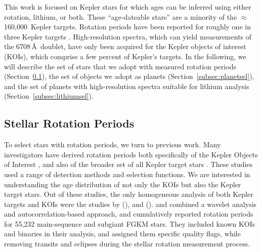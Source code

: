 \documentclass[11pt,twocolumn,tighten]{aastex63}
\newcommand{\nkeplerstars}{$\approx$160{,}000}
\begin{document}
This work is focused on Kepler stars for which ages can be inferred
using either rotation, lithium, or both.  These ``age-dateable
stars'' are a minority of the \nkeplerstars\ Kepler targets.  Rotation
periods have been reported for roughly one in three Kepler targets
\citep[e.g.][]{McQuillan_2014,Santos_2021}.  High-resolution spectra,
which can yield measurements of the  6708\,\AA\ doublet, 
have only been acquired for the Kepler objects of interest
(KOIs), which comprise a few percent of Kepler's targets.
In the following, we will describe the set of stars that we
adopt with measured rotation periods (Section~\ref{subsec:rotsel}),
the set of objects we adopt as planets
(Section~\ref{subsec:planetsel}), and the set of planets with
high-resolution spectra suitable for lithium analysis
(Section~\ref{subsec:lithiumsel}).


\subsection{Stellar Rotation Periods}
\label{subsec:rotsel}

To select stars with rotation periods, we turn to previous work.
Many investigators have derived rotation periods both specifically of
the Kepler Objects of Interest
\citep{McQuillan_2013,Walkowicz_2013,Mazeh_2015,Angus_2018,David_2021},
and also of the broader set of all Kepler target stars
\citep{McQuillan_2014,Reinhold_2015,Santos_2019,Santos_2021}.
These studies used a range of detection methods and selection
functions.
We are interested in understanding the age distribution of not only
the KOIs but also the Kepler target stars.
Out of these studies, the only homogeneous analysis of both Kepler
targets and KOIs were the studies by
\citet{Santos_2019} (),
and \citet{Santos_2021} ().
 and
 combined a wavelet analysis and
autocorrelation-based approach, and cumulatively reported rotation
periods for 55{,}232 main-sequence and subgiant FGKM stars.
They included known KOIs and binaries in their analysis, and assigned
them specific quality flags, while removing transits and eclipses
during the stellar rotation measurement process. 
\end{document}
